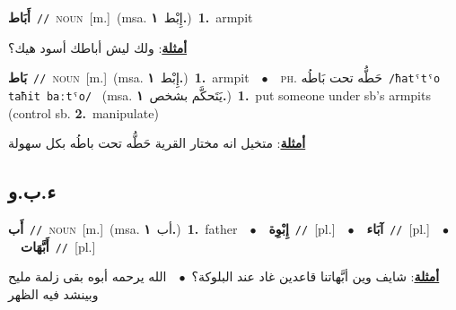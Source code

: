 \documentclass[10pt,a4paper,twoside]{article} %
\begin{document}
\begin{multicols}{2}
{{\setlength\topsep{0pt}\textbf{\foreignlanguage{arabic}{أَبَاط}}\ {\color{gray}\texttt{//}\color{black}}\ \textsc{noun}\ [m.]\ \color{gray}(msa. \foreignlanguage{arabic}{إِبْط}~\foreignlanguage{arabic}{\textbf{١.}})\color{black}\ \textbf{1.}~armpit\  \begin{flushright}\color{gray}\foreignlanguage{arabic}{\textbf{\underline{\foreignlanguage{arabic}{أمثلة}}}: ولك ليش أباطك أسود هيك؟}\end{flushright}\color{black}} \vspace{2mm}

{\setlength\topsep{0pt}\textbf{\foreignlanguage{arabic}{بَاط}}\ {\color{gray}\texttt{//}\color{black}}\ \textsc{noun}\ [m.]\ \color{gray}(msa. \foreignlanguage{arabic}{إِبْط}~\foreignlanguage{arabic}{\textbf{١.}})\color{black}\ \textbf{1.}~armpit\ \ $\bullet$\ \ \textsc{ph.} \color{gray} \foreignlanguage{arabic}{حَطُّه تحت بَاطُه}\color{black}\ {\color{gray}\texttt{/{\sffamily ħatˤtˤo taħit baːtˤo}/}\color{black}}\ \color{gray} (msa. \foreignlanguage{arabic}{يَتَحكَّم بشخص}~\foreignlanguage{arabic}{\textbf{١.}})\color{black}\ \textbf{1.}~put someone under sb's armpits (control sb.  \textbf{2.}~manipulate)\  \begin{flushright}\color{gray}\foreignlanguage{arabic}{\textbf{\underline{\foreignlanguage{arabic}{أمثلة}}}: متخيل انه مختار القرية حَطُّه تحت باطُه بكل سهولة}\end{flushright}\color{black}} \vspace{2mm}

\vspace{-3mm}
\subsection*{\color{blue}\foreignlanguage{arabic}{ء.ب.و}\color{blue}{}} 

{\setlength\topsep{0pt}\textbf{\foreignlanguage{arabic}{أَب}}\ {\color{gray}\texttt{//}\color{black}}\ \textsc{noun}\ [m.]\ \color{gray}(msa. \foreignlanguage{arabic}{أب}~\foreignlanguage{arabic}{\textbf{١.}})\color{black}\ \textbf{1.}~father\ \ $\bullet$\ \ \setlength\topsep{0pt}\textbf{\foreignlanguage{arabic}{إِبْوِة}}\ {\color{gray}\texttt{//}\color{black}}\ [pl.]\ \ $\bullet$\ \ \setlength\topsep{0pt}\textbf{\foreignlanguage{arabic}{آبَاء}}\ {\color{gray}\texttt{//}\color{black}}\ [pl.]\ \ $\bullet$\ \ \setlength\topsep{0pt}\textbf{\foreignlanguage{arabic}{أَبَّهَات}}\ {\color{gray}\texttt{//}\color{black}}\ [pl.]\  \begin{flushright}\color{gray}\foreignlanguage{arabic}{\textbf{\underline{\foreignlanguage{arabic}{أمثلة}}}: شايف وين أبَّهاتنا قاعدين غاد عند البلوكة؟\ $\bullet$\ \  الله يرحمه أبوه بقى زلمة مليح وبينشد فيه الظهر}\end{flushright}\color{black}} \vspace{2mm}

}
\end{multicols}
\end{document}
